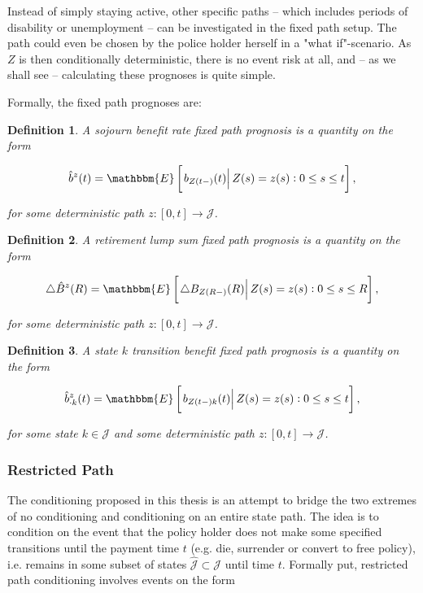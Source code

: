 \documentclass{article}
\newcommand{\1}[1]{\mathbbm{1}_{\left\lbrace #1 \right\rbrace}}
\newcommand{\econd}[2][def]{\mathbbm{E} \left[ \left. #1 \right| #2 \right]}
\theoremstyle{break}
\newtheorem{definition}{Definition}[section]
\theoremstyle{remark}
\numberwithin{equation}{section}
\begin{document}
Instead of simply staying active, other specific paths -- which includes periods of disability or unemployment -- can be investigated in the fixed path setup. The path could even be chosen by the police holder herself in a "what if"-scenario. As $Z$ is then conditionally deterministic, there is no event risk at all, and -- as we shall see -- calculating these prognoses is quite simple.

Formally, the fixed path prognoses are:

\begin{definition} \label{DefSojFix}
	A sojourn benefit rate fixed path prognosis is a quantity on the form
	
	\begin{gather*}
		\hat{b}^z(t) = \econd[b_{Z(t-)}(t)]{Z(s) = z(s) : 0 \leq s \leq t},
	\end{gather*}
	
	for some deterministic path $z: [0,t] \to \mathcal{J}$.
\end{definition}

\begin{definition} \label{DefLumpFix}
	A retirement lump sum fixed path prognosis is a quantity on the form
	
	\begin{gather*}
		\triangle \hat{B}^z(R) = \econd[\triangle B_{Z(R-)}(R)]{Z(s) = z(s) : 0 \leq s \leq R},
	\end{gather*}
	
	for some deterministic path $z: [0,t] \to \mathcal{J}$.
\end{definition}

\begin{definition} \label{DefTraFix}
	A state $k$ transition benefit fixed path prognosis is a quantity on the form
	
	\begin{gather*}
		\hat{b}_{\cdot k}^z(t) = \econd[b_{Z(t-)k}(t)]{ Z(s) = z(s) : 0 \leq s \leq t},
	\end{gather*}
	
	for some state $k \in \mathcal{J}$ and some deterministic path $z: [0,t] \to \mathcal{J}$.
\end{definition}

\subsubsection{Restricted Path} \label{RestrPathSect}

The conditioning proposed in this thesis is an attempt to bridge the two extremes of no conditioning and conditioning on an entire state path. The idea is to condition on the event that the policy holder does not make some specified transitions until the payment time $t$ (e.g. die, surrender or convert to free policy), i.e. remains in some subset of states $\hat{\mathcal{J}} \subset \mathcal{J}$ until time $t$. Formally put, restricted path conditioning involves events on the form
\end{document}
